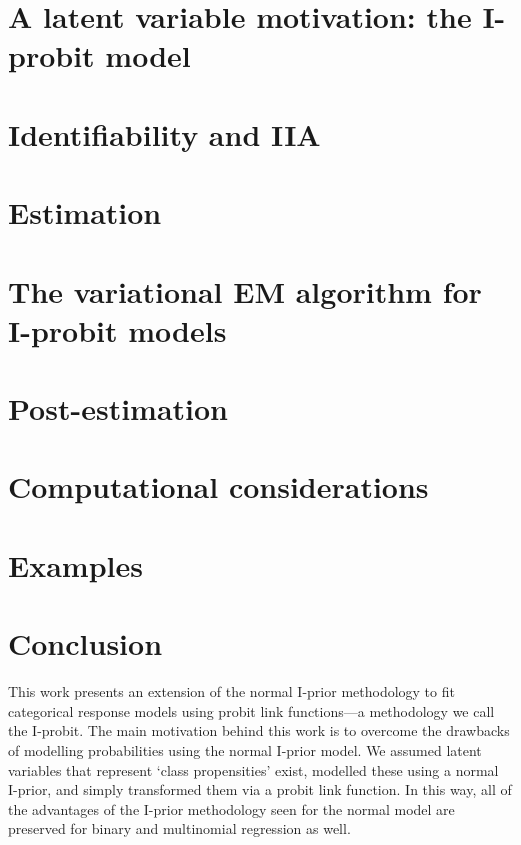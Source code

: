\documentclass[showframe,11pt,twoside,openright]{report}
\begin{document}
%

\section{A latent variable motivation: the I-probit model}


\section{Identifiability and IIA}\label{sec:iia}


\section{Estimation}


\section{The variational EM algorithm for I-probit models}\label{sec:iprobitvar}


\section{Post-estimation}\label{sec:iprobitpostest}


\section{Computational considerations}


\section{Examples}
\label{sec:iprobiteg}


\section{Conclusion}

This work presents an extension of the normal I-prior methodology to fit categorical response models using probit link functions---a methodology we call the I-probit.
The main motivation behind this work is to overcome the drawbacks of modelling probabilities using the normal I-prior model.
We assumed latent variables that represent `class propensities' exist, modelled these using a normal I-prior, and simply transformed them via a probit link function.
In this way, all of the advantages of the I-prior methodology seen for the normal model are preserved for binary and multinomial regression as well.
\end{document}
